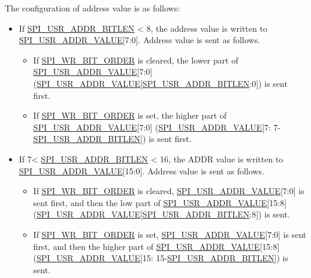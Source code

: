 \documentclass[main\_\_EN.tex]{subfiles}
\begin{document}
The configuration of address value is as follows:

\begin{itemize}

\item If \hyperref[fielddesc:SPIUSRADDRBITLEN]{SPI\_USR\_ADDR\_BITLEN} < 8, the address value is written to \hyperref[fielddesc:SPIUSRADDRVALUE]{SPI\_USR\_ADDR\_VALUE}[7:0]. Address value is sent as follows.
\begin{itemize}
    \item If \hyperref[fielddesc:SPIWRBITORDER]{SPI\_WR\_BIT\_ORDER} is cleared, the lower part of \hyperref[fielddesc:SPIUSRADDRVALUE]{SPI\_USR\_ADDR\_VALUE}[7:0] (\hyperref[fielddesc:SPIUSRADDRVALUE]{SPI\_USR\_ADDR\_VALUE}[\hyperref[fielddesc:SPIUSRADDRBITLEN]{SPI\_USR\_ADDR\_BITLEN}:0]) is sent first.
    \item If \hyperref[fielddesc:SPIWRBITORDER]{SPI\_WR\_BIT\_ORDER} is set, the higher part of \hyperref[fielddesc:SPIUSRADDRVALUE]{SPI\_USR\_ADDR\_VALUE}[7:0] (\hyperref[fielddesc:SPIUSRADDRVALUE]{SPI\_USR\_ADDR\_VALUE}[7: 7-\hyperref[fielddesc:SPIUSRADDRBITLEN]{SPI\_USR\_ADDR\_BITLEN}]) is sent first.
\end{itemize}

\item  If 7< \hyperref[fielddesc:SPIUSRADDRBITLEN]{SPI\_USR\_ADDR\_BITLEN} < 16, the ADDR value is written to \hyperref[fielddesc:SPIUSRADDRVALUE]{SPI\_USR\_ADDR\_VALUE}[15:0]. Address value is sent as follows.
\begin{itemize}
    \item If \hyperref[fielddesc:SPIWRBITORDER]{SPI\_WR\_BIT\_ORDER} is cleared, \hyperref[fielddesc:SPIUSRADDRVALUE]{SPI\_USR\_ADDR\_VALUE}[7:0] is sent first, and then the low part of  \hyperref[fielddesc:SPIUSRADDRVALUE]{SPI\_USR\_ADDR\_VALUE}[15:8] (\hyperref[fielddesc:SPIUSRADDRVALUE]{SPI\_USR\_ADDR\_VALUE}[\hyperref[fielddesc:SPIUSRADDRBITLEN]{SPI\_USR\_ADDR\_BITLEN}:8]) is sent.
    \item If \hyperref[fielddesc:SPIWRBITORDER]{SPI\_WR\_BIT\_ORDER} is set, \hyperref[fielddesc:SPIUSRADDRVALUE]{SPI\_USR\_ADDR\_VALUE}[7:0] is sent first, and then the higher part of  \hyperref[fielddesc:SPIUSRADDRVALUE]{SPI\_USR\_ADDR\_VALUE}[15:8] (\hyperref[fielddesc:SPIUSRADDRVALUE]{SPI\_USR\_ADDR\_VALUE}[15: 15-\hyperref[fielddesc:SPIUSRADDRBITLEN]{SPI\_USR\_ADDR\_BITLEN}]) is sent.
\end{itemize}
\end{itemize}
\end{document}
